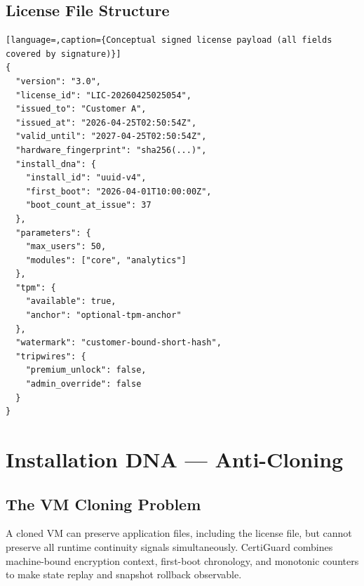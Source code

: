 \documentclass[11pt,a4paper]{article}
\begin{document}
\subsection{License File Structure}
\begin{lstlisting}[language=,caption={Conceptual signed license payload (all fields covered by signature)}]
{
  "version": "3.0",
  "license_id": "LIC-20260425025054",
  "issued_to": "Customer A",
  "issued_at": "2026-04-25T02:50:54Z",
  "valid_until": "2027-04-25T02:50:54Z",
  "hardware_fingerprint": "sha256(...)",
  "install_dna": {
    "install_id": "uuid-v4",
    "first_boot": "2026-04-01T10:00:00Z",
    "boot_count_at_issue": 37
  },
  "parameters": {
    "max_users": 50,
    "modules": ["core", "analytics"]
  },
  "tpm": {
    "available": true,
    "anchor": "optional-tpm-anchor"
  },
  "watermark": "customer-bound-short-hash",
  "tripwires": {
    "premium_unlock": false,
    "admin_override": false
  }
}
\end{lstlisting}

\section{Installation DNA --- Anti-Cloning}

\subsection{The VM Cloning Problem}
A cloned VM can preserve application files, including the license file, but cannot preserve all runtime continuity signals simultaneously. CertiGuard combines machine-bound encryption context, first-boot chronology, and monotonic counters to make state replay and snapshot rollback observable.
\end{document}
